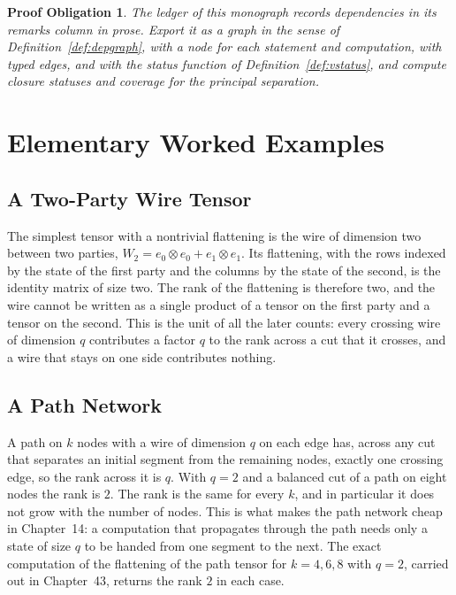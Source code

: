 \documentclass[11pt,letterpaper]{report}
\theoremstyle{plain}
\newtheorem{obligation}[theorem]{Proof Obligation}
\theoremstyle{definition}
\theoremstyle{remark}
\begin{document}
\begin{obligation}\label{ob:ledgerexport}
The ledger of this monograph records dependencies in its remarks column in prose. Export it as a graph in the sense of Definition~\ref{def:depgraph}, with a node for each statement and computation, with typed edges, and with the status function of Definition~\ref{def:vstatus}, and compute closure statuses and coverage for the principal separation.
\end{obligation}

\chapter{Elementary Worked Examples}

\section{A Two-Party Wire Tensor}

The simplest tensor with a nontrivial flattening is the wire of dimension two between two parties, $W_2=e_0\otimes e_0+e_1\otimes e_1$. Its flattening, with the rows indexed by the state of the first party and the columns by the state of the second, is the identity matrix of size two. The rank of the flattening is therefore two, and the wire cannot be written as a single product of a tensor on the first party and a tensor on the second. This is the unit of all the later counts: every crossing wire of dimension $q$ contributes a factor $q$ to the rank across a cut that it crosses, and a wire that stays on one side contributes nothing.

\section{A Path Network}

A path on $k$ nodes with a wire of dimension $q$ on each edge has, across any cut that separates an initial segment from the remaining nodes, exactly one crossing edge, so the rank across it is $q$. With $q=2$ and a balanced cut of a path on eight nodes the rank is $2$. The rank is the same for every $k$, and in particular it does not grow with the number of nodes. This is what makes the path network cheap in Chapter~14: a computation that propagates through the path needs only a state of size $q$ to be handed from one segment to the next. The exact computation of the flattening of the path tensor for $k=4,6,8$ with $q=2$, carried out in Chapter~43, returns the rank $2$ in each case.
\end{document}

